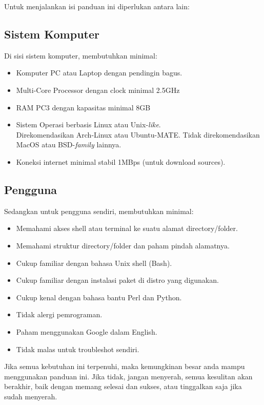 \documentclass[12pt,]{article}
\begin{document}
	Untuk menjalankan isi panduan ini diperlukan antara lain:
	
	\subsection{Sistem Komputer}
	Di sisi sistem komputer, membutuhkan minimal:
	
	\begin{itemize}
		\item Komputer PC atau Laptop dengan pendingin bagus.
		\item Multi-Core Processor dengan clock minimal 2.5GHz
		\item RAM PC3 dengan kapasitas minimal 8GB
		\item Sistem Operasi berbasis Linux atau Unix-\textit{like}.\\
		Direkomendasikan Arch-Linux atau Ubuntu-MATE.
		Tidak direkomendasikan MacOS atau BSD-\textit{family} lainnya.
		\item Koneksi internet minimal stabil 1MBps (untuk download sources).
	\end{itemize}
	
	\subsection{Pengguna}
	Sedangkan untuk pengguna sendiri, membutuhkan minimal:
	
	\begin{itemize}
		\item Memahami akses shell atau terminal ke suatu alamat directory/folder.
		\item Memahami struktur directory/folder dan paham pindah alamatnya.
		\item Cukup familiar dengan bahasa Unix shell (Bash).
		\item Cukup familiar dengan instalasi paket di distro yang digunakan.
		\item Cukup kenal dengan bahasa bantu Perl dan Python.
		\item Tidak alergi pemrograman.
		\item Paham menggunakan Google dalam English.
		\item Tidak malas untuk troubleshot sendiri.
	\end{itemize}

	Jika semua kebutuhan ini terpenuhi, maka kemungkinan besar anda mampu menggunakan panduan ini.
	Jika tidak, jangan menyerah, semua kesulitan akan berakhir, baik dengan memang selesai dan sukses, atau tinggalkan saja jika sudah menyerah.
	
\end{document}
